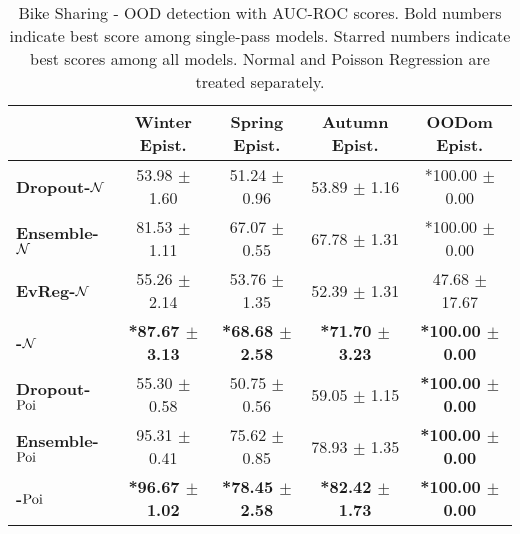\begin{table*}[ht]
    \centering
    \caption{Bike Sharing - OOD detection with AUC-ROC scores. Bold numbers indicate best score among single-pass models. Starred numbers indicate best scores among all models. Normal and Poisson Regression are treated separately.}
    \label{tab:auroc-bikesharing}
    \scriptsize
    \begin{tabular}{lcccc}
        \toprule
        & \textbf{Winter Epist.} & \textbf{Spring Epist.} & \textbf{Autumn Epist.} & \textbf{OODom Epist.} \\
        \midrule
        \textbf{Dropout-$\operatorname{\mathcal{N}}$} & 53.98 $\pm$ 1.60 & 51.24 $\pm$ 0.96 & 53.89 $\pm$ 1.16 & *100.00 $\pm$ 0.00 \\
        \textbf{Ensemble-$\operatorname{\mathcal{N}}$} & 81.53 $\pm$ 1.11 & 67.07 $\pm$ 0.55 & 67.78 $\pm$ 1.31 & *100.00 $\pm$ 0.00 \\
        \midrule
        \textbf{EvReg-$\operatorname{\mathcal{N}}$} & 55.26 $\pm$ 2.14 & 53.76 $\pm$ 1.35 & 52.39 $\pm$ 1.31 & 47.68 $\pm$ 17.67 \\
        \textbf{\oursacro{}-$\operatorname{\mathcal{N}}$} & \textbf{*87.67 $\pm$ 3.13} & \textbf{*68.68 $\pm$ 2.58} & \textbf{*71.70 $\pm$ 3.23} & \textbf{*100.00 $\pm$ 0.00} \\
        \midrule
        \midrule
        \textbf{Dropout-$\operatorname{Poi}$} & 55.30 $\pm$ 0.58 & 50.75 $\pm$ 0.56 & 59.05 $\pm$ 1.15 & \textbf{*100.00 $\pm$ 0.00} \\
        \textbf{Ensemble-$\operatorname{Poi}$} & 95.31 $\pm$ 0.41 & 75.62 $\pm$ 0.85 & 78.93 $\pm$ 1.35 & \textbf{*100.00 $\pm$ 0.00} \\
        \midrule
        \textbf{\oursacro{}-$\operatorname{Poi}$} & \textbf{*96.67 $\pm$ 1.02} & \textbf{*78.45 $\pm$ 2.58} & \textbf{*82.42 $\pm$ 1.73} & \textbf{*100.00 $\pm$ 0.00} \\
        \bottomrule
    \end{tabular}
\end{table*}